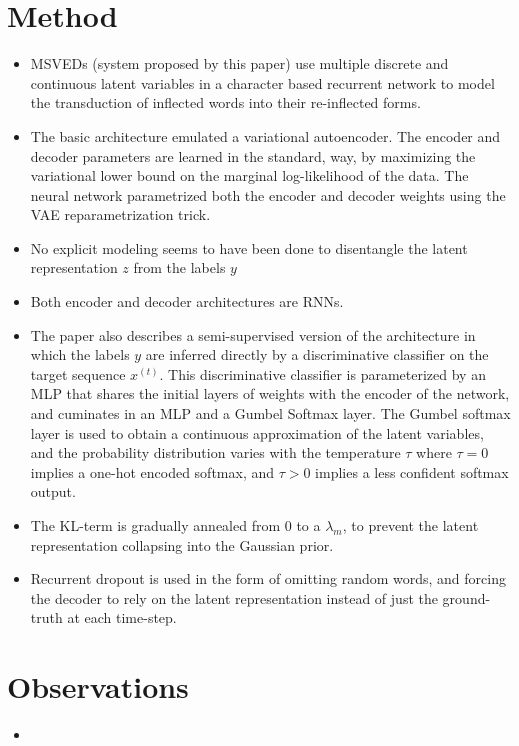 \documentclass[12pt]{scrartcl}
\begin{document}
\section{Method}
  \begin{itemize}
    \item MSVEDs (system proposed by this paper) use multiple discrete and continuous latent variables in a character based recurrent network to model the transduction of inflected words into their re-inflected forms.
    \item The basic architecture emulated a variational autoencoder. The encoder and decoder parameters are learned in the standard, way, by maximizing the variational lower bound on the marginal log-likelihood of the data. The neural network parametrized both the encoder and decoder weights using the VAE reparametrization trick.
    \item No explicit modeling seems to have been done to disentangle the latent representation $z$ from the labels $y$
    \item Both encoder and decoder architectures are RNNs.
    \item The paper also describes a semi-supervised version of the architecture in which the labels $y$ are inferred directly by a discriminative classifier on the target sequence $x^{(t)}$. This discriminative classifier is parameterized by an MLP that shares the initial layers of weights with the encoder of the network, and cuminates in an MLP and a Gumbel Softmax layer. The Gumbel softmax layer is used to obtain a continuous approximation of the latent variables, and the probability distribution varies with the temperature $\tau$ where $\tau = 0$ implies a one-hot encoded softmax, and $\tau > 0$ implies a less confident softmax output.
    \item The KL-term is gradually annealed from 0 to a $\lambda_m$, to prevent the latent representation collapsing into the Gaussian prior.
    \item Recurrent dropout is used in the form of omitting random words, and forcing the decoder to rely on the latent representation instead of just the ground-truth at each time-step.
  \end{itemize}

\section{Observations}
  \begin{itemize}
    \item 
  \end{itemize}



\end{document}
